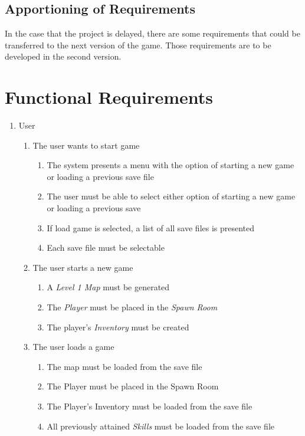 \documentclass[12pt, titlepage]{article}
\begin{document}
  \subsection{Apportioning of Requirements}
  In the case that the project is delayed, there are some requirements that could be transferred to the next version of the game. Those requirements are to be developed in the second version.

\section{Functional Requirements}

\begin{enumerate}[{VP}1.]
  \item User
  \begin{enumerate}[{BE1}.1]
    \item The user wants to start game
    \begin{enumerate}
      \item The system presents a menu with the option of starting a new game or loading a previous save file
      \item The user must be able to select either option of starting a new game or loading a previous save
      \item If load game is selected, a list of all save files is presented
      \item Each save file must be selectable
    \end{enumerate}
    \item The user starts a new game
    \begin{enumerate}
      \item A \textit{Level 1 Map} must be generated
      \item The \textit{Player} must be placed in the \textit{Spawn Room}
      \item The player's \textit{Inventory} must be created
    \end{enumerate}
    \item The user loads a game
    \begin{enumerate}
      \item The map must be loaded from the save file
      \item The Player must be placed in the Spawn Room
      \item The Player's Inventory must be loaded from the save file
      \item All previously attained \textit{Skills} must be loaded from the save file

\end{enumerate}
\end{enumerate}
\end{enumerate}
\end{document}
